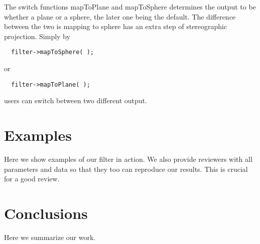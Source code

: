\documentclass{InsightArticle}
\begin{document}
The switch functions mapToPlane and mapToSphere determines the output to be whether a plane or a sphere, the later one being the default.
The difference between the two is mapping to sphere has an extra step of stereographic projection.
Simply by

\begin{verbatim}
  filter->mapToSphere( ); 
\end{verbatim}

or

\begin{verbatim}
  filter->mapToPlane( ); 
\end{verbatim}

users can switch between two different output.

\section{Examples}

Here we show examples of our filter in action.  We also provide
reviewers with all parameters and data so that they too can
reproduce our results.  This is crucial for a good review.


\section{Conclusions}

Here we summarize our work.





%
%
%
%
%
%
%
%
\end{document}
